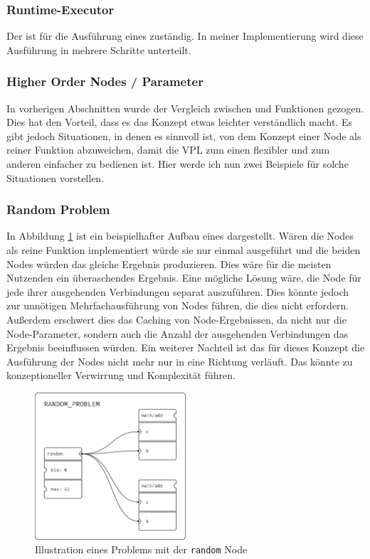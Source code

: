 \documentclass[ngerman]{article}
\begin{document}
\subsubsection{Runtime-Executor}
\label{sec:runtime_executor}

Der  ist für die Ausführung eines  zuständig. In meiner Implementierung wird diese Ausführung in mehrere Schritte unterteilt.

\pagebreak

\subsubsection{Higher Order Nodes / Parameter}
\label{sec:HON}
In vorherigen Abschnitten wurde der Vergleich zwischen  und Funktionen gezogen. Dies hat den Vorteil, dass es das Konzept etwas leichter verständlich macht.
Es gibt jedoch Situationen, in denen es sinnvoll ist, von dem Konzept einer Node als reiner Funktion abzuweichen, damit die VPL zum einen flexibler und zum anderen einfacher zu bedienen ist. Hier werde ich nun zwei Beispiele für solche Situationen vorstellen.
\subsubsection*{Random Problem}
In Abbildung \ref{fig:random_problem} ist ein beispielhafter Aufbau eines  dargestellt. Wären die  Nodes als reine Funktion implementiert würde sie nur einmal ausgeführt und die beiden  Nodes würden das gleiche Ergebnis produzieren. Dies wäre für die meisten Nutzenden ein überaschendes Ergebnis.
\br
Eine mögliche Lösung wäre, die  Node für jede ihrer ausgehenden Verbindungen separat auszuführen. 
Dies könnte jedoch zur unnötigen Mehrfachausführung von Nodes führen, die dies nicht erfordern.
Außerdem erschwert dies das Caching von Node-Ergebnissen, da nicht nur die Node-Parameter, sondern auch die Anzahl der ausgehenden Verbindungen das Ergebnis beeinflussen würden.
\br
Ein weiterer Nachteil ist das für dieses Konzept die Ausführung der Nodes nicht mehr nur in eine Richtung verläuft. Das könnte zu konzeptioneller Verwirrung und Komplexität führen.
\br
\begin{figure}[htbp]
  \centering
  \includegraphics[width=0.5\textwidth]{graphics/RANDOM_PROBLEM.pdf}
  \caption{Illustration eines Problems mit der \texttt{random} Node}
  \label{fig:random_problem}
\end{figure}
\end{document}
